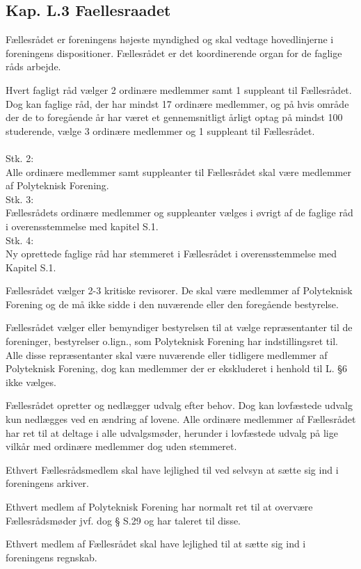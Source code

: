 \begin{list}
\subsection{Kap. L.3 Faellesraadet}
\label{kap:faellesraadet}
\item Fællesrådet er foreningens højeste myndighed og skal vedtage hovedlinjerne i foreningens dispositioner. Fællesrådet er det koordinerende organ for de faglige råds arbejde.

\item Hvert fagligt råd vælger 2 ordinære medlemmer samt 1 suppleant til Fællesrådet. Dog kan faglige råd, der har mindst 17 ordinære medlemmer, og på hvis område der de to foregående år har været et gennemsnitligt årligt optag på mindst 100 studerende, vælge 3 ordinære medlemmer og 1 suppleant til Fællesrådet.\\
\\
Stk. 2: \\
Alle ordinære medlemmer samt suppleanter til Fællesrådet skal være medlemmer af Polyteknisk Forening.\\
Stk. 3: \\
Fællesrådets ordinære medlemmer og suppleanter vælges i øvrigt af de faglige råd i overensstemmelse med kapitel S.1.
\\
Stk. 4: \\
Ny oprettede faglige råd har stemmeret i Fællesrådet i overensstemmelse med Kapitel S.1.

\item Fællesrådet vælger 2-3 kritiske revisorer. De skal være medlemmer af Polyteknisk Forening og de må ikke sidde i den nuværende eller den foregående bestyrelse. 

\item Fællesrådet vælger eller bemyndiger bestyrelsen til at vælge repræsentanter til de foreninger, bestyrelser o.lign., som Polyteknisk Forening har indstillingsret til. Alle disse repræsentanter skal være nuværende eller tidligere medlemmer af Polyteknisk Forening, dog kan medlemmer der er ekskluderet i henhold til L. §6 ikke vælges.

\item Fællesrådet opretter og nedlægger udvalg efter behov. Dog kan lovfæstede udvalg kun nedlægges ved en ændring af lovene. Alle ordinære medlemmer af Fællesrådet har ret til at deltage i alle udvalgsmøder, herunder i lovfæstede udvalg på lige vilkår med ordinære medlemmer dog uden stemmeret.

\item Ethvert Fællesrådsmedlem skal have lejlighed til ved selvsyn at sætte sig ind i foreningens arkiver.
\item Ethvert medlem af Polyteknisk Forening har normalt ret til at overvære Fællesrådsmøder jvf. dog § S.29 og har taleret til disse.
\item Ethvert medlem af Fællesrådet skal have lejlighed til at sætte sig ind i foreningens regnskab.



\end{list}
